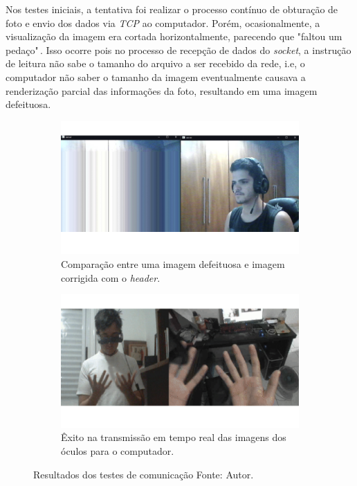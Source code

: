
Nos testes iniciais, a tentativa foi realizar o processo contínuo de obturação de foto e envio dos dados via \textit{TCP} ao computador. Porém, ocasionalmente, a visualização da imagem era cortada horizontalmente, parecendo que "faltou um pedaço"\(\,\). Isso ocorre pois no processo de recepção de dados do \textit{socket}, a instrução de leitura não sabe o tamanho do arquivo a ser recebido da rede, i.e, o computador não saber o tamanho da imagem eventualmente causava a renderização parcial das informações da foto, resultando em uma imagem defeituosa.

\begin{figure}[ht]
    \centering
        \begin{subfigure}{.45\textwidth}
            \centering
            \includegraphics[width=.95\linewidth]{figuras/header.png}
    \caption{Comparação entre uma imagem defeituosa e imagem corrigida com o \textit{header}.}
    \label{fig:header}
        \end{subfigure}
        \begin{subfigure}{.45\textwidth}
            \centering
            \includegraphics[width=.95\linewidth]{figuras/comm.png}
            \caption{Êxito na transmissão em tempo real das imagens dos óculos para o computador.}
            \label{fig:communication}
        \end{subfigure}
        \caption{Resultados dos testes de comunicação Fonte: Autor.}
        \label{fig:comm-tests}
\end{figure}

